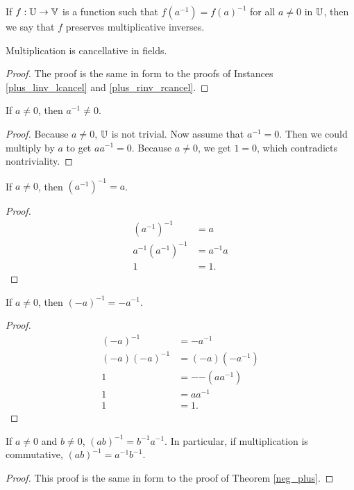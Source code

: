 \documentclass[../math.tex]{subfiles}
\begin{document}
\begin{class}
    If $f : \mathbb{U} \to \mathbb{V}$ is a function such that $f(a^{-1}) = f(a)^{-1}$ for all
    $a \neq 0$ in $\mathbb{U}$, then we say that $f$ preserves multiplicative inverses.
\end{class}

\begin{instance}
    Multiplication is cancellative in fields.
\end{instance}
\begin{proof}
    The proof is the same in form to the proofs of Instances
    \ref{plus_linv_lcancel} and \ref{plus_rinv_rcancel}.
\end{proof}

\begin{theorem}
    If $a \neq 0$, then $a^{-1} \neq 0$.
\end{theorem}
\begin{proof}
    Because $a \neq 0$, $\mathbb{U}$ is not trivial.  Now assume that $a^{-1} = 0$.
    Then we could multiply by $a$ to get $aa^{-1} = 0$.  Because $a \neq 0$, we
    get $1 = 0$, which contradicts nontriviality.
\end{proof}

\begin{theorem}
    If $a \neq 0$, then $(a^{-1})^{-1} = a$.
\end{theorem}
\begin{proof}
    \begin{align*}
        (a^{-1})^{-1} &= a \\
        a^{-1} (a^{-1})^{-1} &= a^{-1} a \\
        1 &= 1.
    \end{align*}
\end{proof}

\begin{theorem}
    If $a \neq 0$, then $(-a)^{-1} = -a^{-1}$.
\end{theorem}
\begin{proof}
    \begin{align*}
        (-a)^{-1} &= -a^{-1} \\
        (-a)(-a)^{-1} &= (-a)(-a^{-1}) \\
        1 &= -{-(aa^{-1})} \\
        1 &= aa^{-1} \\
        1 &= 1.
    \end{align*}
\end{proof}

\begin{theorem}
    If $a \neq 0$ and $b \neq 0$, $(ab)^{-1} = b^{-1}a^{-1}$.  In particular, if
    multiplication is commutative, $(ab)^{-1} = a^{-1}b^{-1}$.
\end{theorem}
\begin{proof}
    This proof is the same in form to the proof of Theorem \ref{neg_plus}.
\end{proof}
\end{document}
